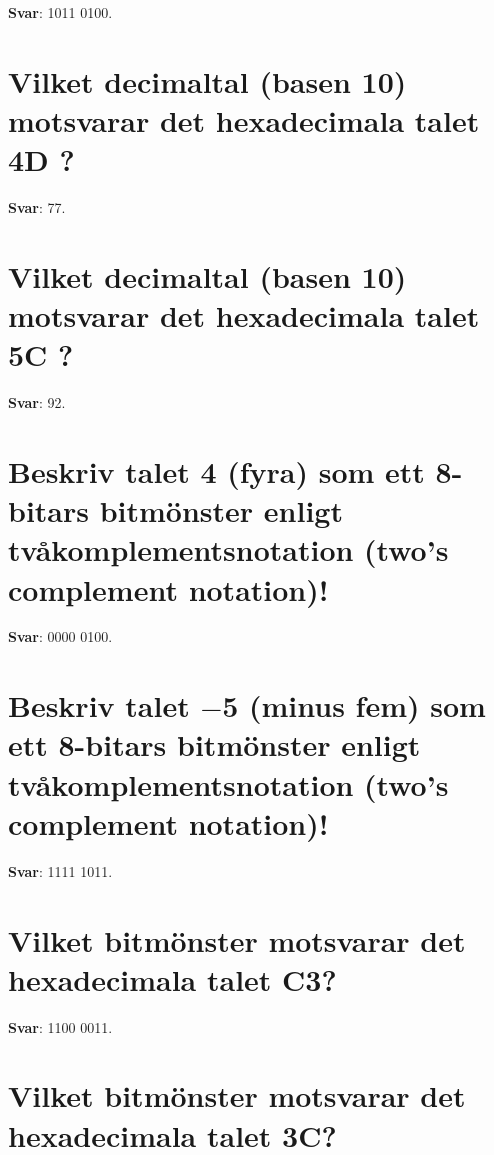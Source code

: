 \documentclass[a4paper,11pt,oneside]{book}
\begin{document}
\begin{sloppypar}
\label{q:383:sa:sv:True}

\textbf{Svar}: 1011 0100.



\section{Vilket decimaltal (basen 10) motsvarar det hexadecimala talet 4D ?}

\label{q:384:sa:sv:True}

\textbf{Svar}: 77.



\section{Vilket decimaltal (basen 10) motsvarar det hexadecimala talet 5C ?}

\label{q:385:sa:sv:True}

\textbf{Svar}: 92.



\section{Beskriv talet 4 (fyra) som ett 8-bitars bitm\"onster enligt tv\r{a}komplementsnotation (two{\textquoteright}s complement notation)!}

\label{q:386:sa:sv:True}

\textbf{Svar}: 0000 0100.



\section{Beskriv talet \ensuremath{-}5 (minus fem) som ett 8-bitars bitm\"onster enligt tv\r{a}komplementsnotation (two{\textquoteright}s complement notation)!}

\label{q:387:sa:sv:True}

\textbf{Svar}: 1111 1011.



\section{Vilket bitm\"onster motsvarar det hexadecimala talet C3?}

\label{q:388:sa:sv:True}

\textbf{Svar}: 1100 0011.



\section{Vilket bitm\"onster motsvarar det hexadecimala talet 3C?}


\end{sloppypar}
\end{document}
